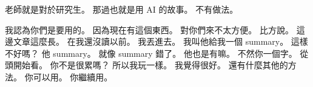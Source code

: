 \hypertarget{w01:cue:3699}{}老師就是對於研究生。
\hypertarget{w01:cue:3700}{}那過也就是用 AI 的故事。
\hypertarget{w01:cue:3701}{}不有做法。

\hypertarget{w01:cue:3702}{}我認為你們是要用的。
\hypertarget{w01:cue:3703}{}因為現在有這個東西。
\hypertarget{w01:cue:3704}{}對你們來不太方便。
\hypertarget{w01:cue:3705}{}比方說。
\hypertarget{w01:cue:3706}{}這邊文章這麼長。
\hypertarget{w01:cue:3707}{}在我還沒讀以前。
\hypertarget{w01:cue:3708}{}我丟進去。
\hypertarget{w01:cue:3709}{}我叫他給我一個 summary。
\hypertarget{w01:cue:3710}{}這樣不好嗎？
\hypertarget{w01:cue:3711}{}他 summary。
\hypertarget{w01:cue:3712}{}就像 summary 錯了。
\hypertarget{w01:cue:3713}{}他也是有嘛。
\hypertarget{w01:cue:3714}{}不然你一個字。
\hypertarget{w01:cue:3715}{}從頭開始看。
\hypertarget{w01:cue:3716}{}你不是很累嗎？
\hypertarget{w01:cue:3717}{}所以我玩一樣。
\hypertarget{w01:cue:3718}{}我覺得很好。
\hypertarget{w01:cue:3719}{}還有什麼其他的方法。
\hypertarget{w01:cue:3720}{}你可以用。
\hypertarget{w01:cue:3721}{}你繼續用。

